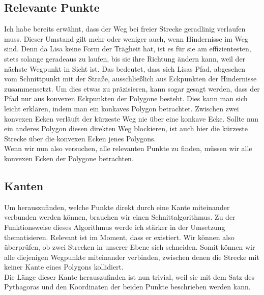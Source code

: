 \documentclass[a4paper,10pt,ngerman]{scrartcl}
\begin{document}
\subsection{Relevante Punkte}
Ich habe bereits erwähnt, dass der Weg bei freier Strecke geradlinig verlaufen muss. Dieser Umstand gilt mehr oder weniger auch, wenn Hindernisse im Weg sind. Denn da Lisa keine Form der Trägheit hat, ist es für sie am effizientesten, stets solange geradeaus zu laufen, bis sie ihre Richtung ändern kann, weil der nächste Wegpunkt in Sicht ist. Das bedeutet, dass sich Lisas Pfad, abgesehen vom Schnittpunkt mit der Stra\ss e, ausschlie\ss lich aus Eckpunkten der Hindernisse zusammensetzt. Um dies etwas zu präzisieren, kann sogar gesagt werden, dass der Pfad nur aus konvexen Eckpunkten der Polygone besteht. Dies kann man sich leicht erklären, indem man ein konkaves Polygon betrachtet. Zwischen zwei konvexen Ecken verläuft der kürzeste Weg nie über eine konkave Ecke. Sollte nun ein anderes Polygon diesen direkten Weg blockieren, ist auch hier die kürzeste Strecke über die konvexen Ecken jenes Polygons.\\
Wenn wir nun also versuchen, alle relevanten Punkte zu finden, müssen wir alle konvexen Ecken der Polygone betrachten.
\subsection{Kanten}
Um herauszufinden, welche Punkte direkt durch eine Kante miteinander verbunden werden können, brauchen wir einen Schnittalgorithmus. Zu der Funktionsweise dieses Algorithmus werde ich stärker in der Umsetzung thematisieren. Relevant ist im Moment, dass er existiert. Wir können also überprüfen, ob zwei Strecken in unserer Ebene sich schneiden. Somit können wir alle diejenigen Wegpunkte miteinander verbinden, zwischen denen die Strecke mit keiner Kante eines Polygons kollidiert.\\
Die Länge dieser Kante herauszufinden ist nun trivial, weil sie mit dem Satz des Pythagoras und den Koordinaten der beiden Punkte beschrieben werden kann.
\end{document}
